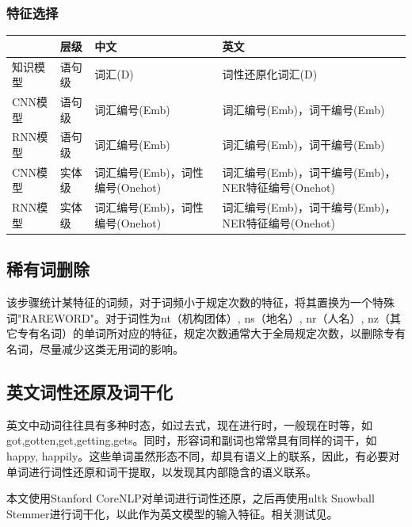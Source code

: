 \subsubsection{特征选择}
\begin{center}
\begin{tabu}to \textwidth{X|X|X[3]|X[3]} 
\hline
& 层级 & 中文 & 英文\\
\hline
知识模型 & 语句级 & 词汇(D) & 词性还原化词汇(D)\\
\hline
CNN模型 & 语句级 & 词汇编号(Emb) & 词汇编号(Emb)，词干编号(Emb)\\
\hline
RNN模型 & 语句级 & 词汇编号(Emb) & 词汇编号(Emb)，词干编号(Emb)\\
\hline
CNN模型 & 实体级 & 词汇编号(Emb)，词性编号(Onehot) & 词汇编号(Emb)，词干编号(Emb)，NER特征编号(Onehot)\\
\hline
RNN模型 & 实体级 & 词汇编号(Emb)，词性编号(Onehot) & 词汇编号(Emb)，词干编号(Emb)，NER特征编号(Onehot)\\
\hline
\end{tabu}
\end{center}

\subsection{稀有词删除}
该步骤统计某特征的词频，对于词频小于规定次数的特征，将其置换为一个特殊词"RAREWORD"。对于词性为nt（机构团体）, ns（地名）, nr（人名）, nz（其它专有名词）的单词所对应的特征，规定次数通常大于全局规定次数，以删除专有名词，尽量减少这类无用词的影响。

\subsection{英文词性还原及词干化}
英文中动词往往具有多种时态，如过去式，现在进行时，一般现在时等，如got,gotten,get,getting,gets。同时，形容词和副词也常常具有同样的词干，如happy, happily。这些单词虽然形态不同，却具有语义上的联系，因此，有必要对单词进行词性还原和词干提取，以发现其内部隐含的语义联系。\par
本文使用Stanford CoreNLP对单词进行词性还原，之后再使用nltk Snowball Stemmer进行词干化，以此作为英文模型的输入特征。相关测试见。